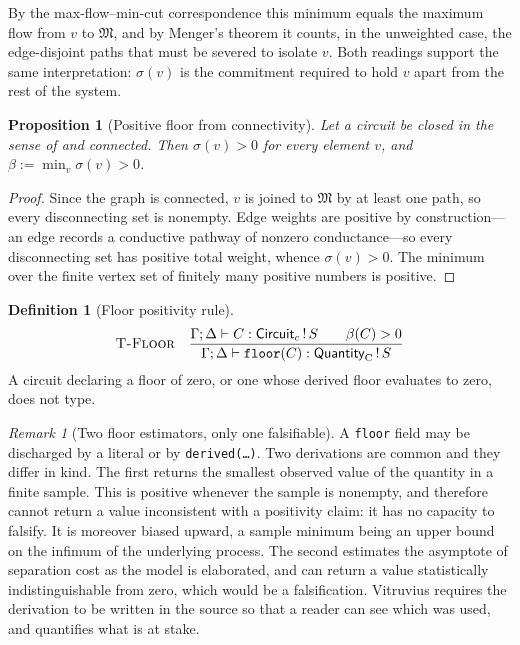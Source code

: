 \documentclass[11pt,twocolumn,a4paper]{article}
\theoremstyle{thmstyle}
\newtheorem{proposition}[theorem]{Proposition}
\theoremstyle{definition}
\newtheorem{definition}[theorem]{Definition}
\theoremstyle{remark}
\newtheorem{remark}[theorem]{Remark}
\newcommand{\med}{\mathfrak{M}}
\newcommand{\sep}{\sigma}
\newcommand{\flo}{\beta}
\newcommand{\Env}{\Gamma}
\newcommand{\Circ}{\textsf{Circuit}}
\begin{document}
By the max-flow--min-cut correspondence \citep{fordfulkerson1956} this
minimum equals the maximum flow from $v$ to $\med$, and by Menger's theorem
\citep{menger1927} it counts, in the unweighted case, the edge-disjoint paths
that must be severed to isolate $v$. Both readings support the same
interpretation: $\sep(v)$ is the commitment required to hold $v$ apart from
the rest of the system.

\begin{proposition}[Positive floor from connectivity]
\label{prop:floor}
Let a circuit be closed in the sense of  and connected.
Then $\sep(v)>0$ for every element $v$, and
$\flo:=\min_{v}\sep(v)>0$.
\end{proposition}

\begin{proof}
Since the graph is connected, $v$ is joined to $\med$ by at least one path, so
every disconnecting set is nonempty. Edge weights are positive by
construction---an edge records a conductive pathway of nonzero conductance---so
every disconnecting set has positive total weight, whence $\sep(v)>0$. The
minimum over the finite vertex set of finitely many positive numbers is
positive.
\end{proof}

\begin{definition}[Floor positivity rule]
\label{def:floor-rule}
\[
\textsc{T-Floor}\quad
\frac{\Env;\Delta\vdash C:\Circ_{c}\,!\,S\qquad \flo(C)>0}
     {\Env;\Delta\vdash \texttt{floor}(C):\textsf{Quantity}_{\mathrm{C}}\,!\,S}
\]
A circuit declaring a floor of zero, or one whose derived floor evaluates to
zero, does not type.
\end{definition}

\begin{remark}[Two floor estimators, only one falsifiable]
\label{rem:floor-estimators}
A \texttt{floor} field may be discharged by a literal or by
\texttt{derived(\ldots)}. Two derivations are common and they differ in kind.
The first returns the smallest observed value of the quantity in a finite
sample. This is positive whenever the sample is nonempty, and therefore cannot
return a value inconsistent with a positivity claim: it has no capacity to
falsify. It is moreover biased upward, a sample minimum being an upper bound
on the infimum of the underlying process. The second estimates the asymptote
of separation cost as the model is elaborated, and can return a value
statistically indistinguishable from zero, which would be a falsification.
Vitruvius requires the derivation to be written in the source so that a reader
can see which was used, and  quantifies what is
at stake.
\end{remark}
\end{document}
